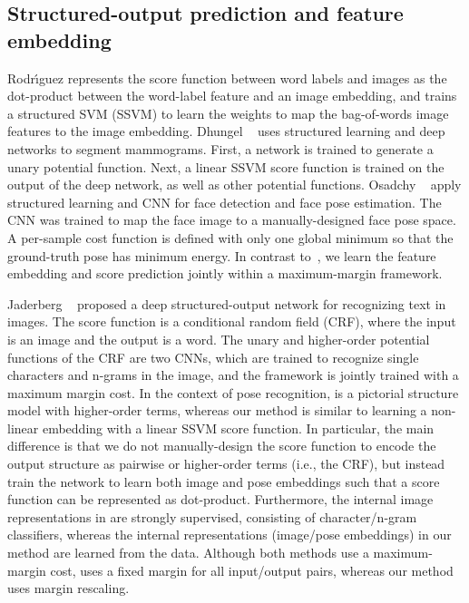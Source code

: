 \documentclass[10pt,twocolumn,letterpaper]{article}
\begin{document}
\subsection{Structured-output prediction and feature embedding}
Rodr{\'{\i}}guez \cite{labelembed2013}
represents the score function between word labels and images as the dot-product between the word-label feature and an image embedding, and trains a structured SVM (SSVM) to learn the weights to map the bag-of-words image features to the image embedding.
Dhungel \etal~\cite{DhungelCB14} uses structured learning and deep networks to segment mammograms.  First, a network is trained to generate a unary potential function.
Next, a linear SSVM score function is trained on the output of the deep network, as well as other potential functions. 
Osadchy \etal~\cite{Osadchy:2007} apply structured learning and CNN %
for face detection and face pose estimation. 
The CNN %
was trained to map the face image to a manually-designed face pose space. A per-sample cost function is defined with only one global minimum so that the ground-truth pose has minimum energy.
In contrast to~\cite{DhungelCB14,labelembed2013,Osadchy:2007}, we learn the feature embedding and score prediction jointly within a maximum-margin framework. 
  

Jaderberg \etal~\cite{deepstruct2015} proposed a deep structured-output network for recognizing text in images. The score function is a conditional random field (CRF), where the input is an image and the output is a word.  The unary and higher-order potential functions of the CRF are two CNNs, which are trained to recognize single characters and n-grams in the image, and the framework is jointly trained with a maximum margin cost.
%
%
In the context of pose recognition, \cite{deepstruct2015} is a pictorial structure model with higher-order terms, whereas our method is similar to learning a non-linear embedding with a linear SSVM score function.
In particular, the main difference is that we do not manually-design the score function to encode the output structure as pairwise or higher-order terms (i.e., the CRF), but instead train the network to learn both image and pose embeddings such that a score function can be represented as dot-product.  Furthermore, the internal image representations in \cite{deepstruct2015} are strongly supervised, consisting of 
 character/n-gram classifiers, whereas the internal representations (image/pose embeddings) in our method are learned from the data.
%
Although both methods use a maximum-margin cost, \cite{deepstruct2015}  uses a fixed margin for all input/output pairs, whereas our method uses margin rescaling.
\end{document}
